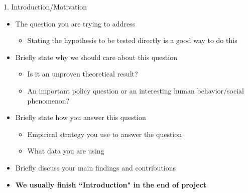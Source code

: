 \documentclass[dvipsnames,hyperref={pdfpagelabels=false}]{beamer}
\begin{document}
\begin{frame}{1. Introduction/Motivation}
	\begin{itemize} 
		
		\item The question you are trying to address
		\vspace{0.2cm}
		\begin{itemize} 
			\item Stating the hypothesis to be tested directly is a good way to do this
		\end{itemize}
		\vspace{0.2cm}
		\item Briefly state why we should care about this question 
		\vspace{0.2cm}
		\begin{itemize}
			\item Is it an unproven theoretical result?
			\vspace{0.2cm} 
			\item An important policy question or an interesting human behavior/social phenomenon?
		\end{itemize}
		\vspace{0.2cm}
		\item Briefly state how you answer this question 
		\vspace{0.2cm}
		\begin{itemize}
			\item Empirical strategy you use to answer the question
			\vspace{0.2cm} 
			\item What data you are using
			\vspace{0.2cm}
		\end{itemize}
		\vspace{0.2cm}
		\item Briefly discuss your main findings  and contributions
		\vspace{0.2cm}
		\item \textbf{We usually finish ``Introduction" in the end of project}
		
		
		
	\end{itemize}
	
	
	
\end{frame}
\end{document}
